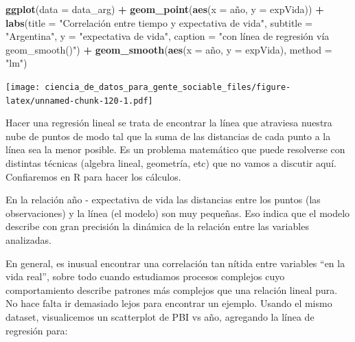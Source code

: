 \documentclass[]{book}
\newenvironment{Shaded}{\begin{snugshade}}{\end{snugshade}}
\newcommand{\KeywordTok}[1]{\textcolor[rgb]{0.13,0.29,0.53}{\textbf{#1}}}
\newcommand{\DataTypeTok}[1]{\textcolor[rgb]{0.13,0.29,0.53}{#1}}
\newcommand{\StringTok}[1]{\textcolor[rgb]{0.31,0.60,0.02}{#1}}
\newcommand{\OperatorTok}[1]{\textcolor[rgb]{0.81,0.36,0.00}{\textbf{#1}}}
\newcommand{\NormalTok}[1]{#1}
\begin{document}
\begin{Shaded}
\begin{Highlighting}[]
\KeywordTok{ggplot}\NormalTok{(}\DataTypeTok{data =}\NormalTok{ data_arg) }\OperatorTok{+}\StringTok{ }
\StringTok{    }\KeywordTok{geom_point}\NormalTok{(}\KeywordTok{aes}\NormalTok{(}\DataTypeTok{x =}\NormalTok{ año, }\DataTypeTok{y =}\NormalTok{ expVida)) }\OperatorTok{+}
\StringTok{    }\KeywordTok{labs}\NormalTok{(}\DataTypeTok{title =} \StringTok{"Correlación entre tiempo y expectativa de vida"}\NormalTok{,}
         \DataTypeTok{subtitle =} \StringTok{"Argentina"}\NormalTok{,}
         \DataTypeTok{y =} \StringTok{"expectativa de vida"}\NormalTok{,}
         \DataTypeTok{caption =} \StringTok{"con línea de regresión vía geom_smooth()"}\NormalTok{) }\OperatorTok{+}
\StringTok{    }\KeywordTok{geom_smooth}\NormalTok{(}\KeywordTok{aes}\NormalTok{(}\DataTypeTok{x =}\NormalTok{ año, }\DataTypeTok{y =}\NormalTok{ expVida), }\DataTypeTok{method =} \StringTok{"lm"}\NormalTok{)}
\end{Highlighting}
\end{Shaded}

\texttt{[image: ciencia\_de\_datos\_para\_gente\_sociable\_files/figure-latex/unnamed-chunk-120-1.pdf]}

Hacer una regresión lineal se trata de encontrar la línea que atraviesa
nuestra nube de puntos de modo tal que la suma de las distancias de cada
punto a la línea sea la menor posible. Es un problema matemático que
puede resolverse con distintas técnicas (algebra lineal, geometría, etc)
que no vamos a discutir aquí. Confiaremos en R para hacer los cálculos.

En la relación año - expectativa de vida las distancias entre los puntos
(las observaciones) y la línea (el modelo) son muy pequeñas. Eso indica
que el modelo describe con gran precisión la dinámica de la relación
entre las variables analizadas.

En general, es inusual encontrar una correlación tan nítida entre
variables ``en la vida real'', sobre todo cuando estudiamos procesos
complejos cuyo comportamiento describe patrones más complejos que una
relación lineal pura. No hace falta ir demasiado lejos para encontrar un
ejemplo. Usando el mismo dataset, visualicemos un scatterplot de PBI vs
año, agregando la línea de regresión para:
\end{document}

